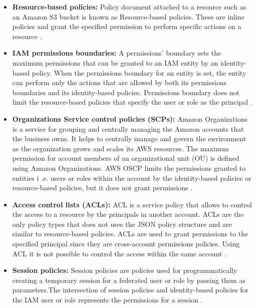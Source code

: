 \begin{itemize}
    \item \textbf{Resource-based policies:} Policy document attached to a resource such as an Amazon S3 bucket is known as Resource-based policies.
    These are inline policies and grant the specified permission to perform specific actions on a resource \cite{25}.
\end{itemize}
\begin{itemize}
    \item \textbf{IAM permissions boundaries:} A permissions' boundary sets the maximum permissions that can be granted to an IAM entity by an identity-based policy.
     When the permissions boundary for an entity is set, the entity can perform only the actions that are allowed by both its permissions boundaries and its identity-based policies.
     Permissions boundary does not limit the
    resource-based policies that specify the user or role as the principal \cite{25}.
\end{itemize}
\begin{itemize}
    \item \textbf{Organizations Service control policies (SCPs):} Amazon Organizations is a service for grouping and centrally managing the Amazon accounts that the business owns.
    It helps to centrally manage and govern the environment as the organization grows and scales its AWS resources.
    The maximun permission for account members of an organizational unit (OU) is defined using Amazon Organizations.
    AWS OSCP limits the permissions granted to entities i
    .e. users or roles within the account by the
    identity-based policies or resource-based policies,
    but it does not grant permissions \cite{25}.

\end{itemize}
\begin{itemize}
    \item \textbf{Access control lists (ACLs):} ACL is a service policy that allows to control the access to a resource by the principals in another account.
    ACLs are the only policy types that does not uses the JSON policy structure and are similar to resource-based policies.
    ACLs are used to grant permissions to the specified principal since they are cross-account permissions policies.
    Using ACL it is not possible to control the access within the same account \cite{25}.
\end{itemize}
\begin{itemize}
    \item \textbf{Session policies:} Session policies are
    policies used for programmatically creating a temporary session for a federated user or role by passing them as parameters.The intersection of session policies and identity-based policies for the IAM user or role represents the permissions for a session \cite{25}.
\end{itemize}

